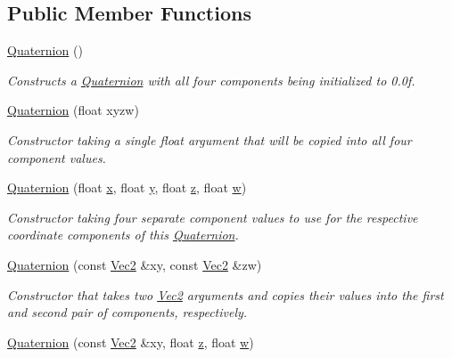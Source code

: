 \subsection*{Public Member Functions}
\begin{DoxyCompactItemize}
\item 
\hyperlink{classgofxmath_1_1_quaternion_a1ed403054c56c0d609956a3943ae582e}{Quaternion} ()
\begin{DoxyCompactList}\small\item\em Constructs a \hyperlink{classgofxmath_1_1_quaternion}{Quaternion} with all four components being initialized to 0.\+0f. \end{DoxyCompactList}\item 
\hyperlink{classgofxmath_1_1_quaternion_a667a43b090ad24b4dc668fe5d5d957ea}{Quaternion} (float xyzw)
\begin{DoxyCompactList}\small\item\em Constructor taking a single float argument that will be copied into all four component values. \end{DoxyCompactList}\item 
\hyperlink{classgofxmath_1_1_quaternion_a2702c11d80f7b4268145c33291281715}{Quaternion} (float \hyperlink{classgofxmath_1_1_vec4_a5de27b4df2e699a1b30ec3a51258f208}{x}, float \hyperlink{classgofxmath_1_1_vec4_a22b749162a1507a1a5d3968b70c6ee4d}{y}, float \hyperlink{classgofxmath_1_1_vec4_a36bc9ebeb3901746c975252b329c1d8c}{z}, float \hyperlink{classgofxmath_1_1_vec4_aeda815ed6e7a8febdffcdfa6cc8a2d04}{w})
\begin{DoxyCompactList}\small\item\em Constructor taking four separate component values to use for the respective coordinate components of this \hyperlink{classgofxmath_1_1_quaternion}{Quaternion}. \end{DoxyCompactList}\item 
\hyperlink{classgofxmath_1_1_quaternion_a8e76b6bd6c995c41ccf6735a33544429}{Quaternion} (const \hyperlink{classgofxmath_1_1_vec2}{Vec2} \&xy, const \hyperlink{classgofxmath_1_1_vec2}{Vec2} \&zw)
\begin{DoxyCompactList}\small\item\em Constructor that takes two \hyperlink{classgofxmath_1_1_vec2}{Vec2} arguments and copies their values into the first and second pair of components, respectively. \end{DoxyCompactList}\item 
\hyperlink{classgofxmath_1_1_quaternion_a2c3769c3fc8018b4459512a8a9e6f2a4}{Quaternion} (const \hyperlink{classgofxmath_1_1_vec2}{Vec2} \&xy, float \hyperlink{classgofxmath_1_1_vec4_a36bc9ebeb3901746c975252b329c1d8c}{z}, float \hyperlink{classgofxmath_1_1_vec4_aeda815ed6e7a8febdffcdfa6cc8a2d04}{w})

\end{DoxyCompactItemize}
